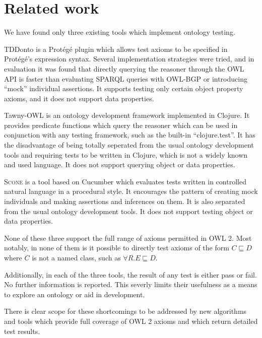 \documentclass[paper.tex]{subfiles}
\begin{document}
\section{Related work}
\label{sec:related}

We have found only three existing tools which implement ontology testing.

TDDonto \cite{Lawrynowicz:TDDontoTool} is a Prot\'eg\'e plugin which allows test axioms to be specified in Prot\'eg\'e's expression syntax.
Several implementation strategies were tried, and in evaluation it was found that directly querying the reasoner through the OWL API \cite{OWLAPI} is faster than evaluating SPARQL queries with OWL-BGP \cite{OWLBGP} or introducing ``mock'' individual assertions.
It supports testing only certain object property axioms, and it does not support data properties.

Tawny-OWL \cite{Warrender:HowWhatWhyTest} is an ontology development framework implemented in Clojure.
It provides predicate functions which query the reasoner which can be used in conjunction with any testing framework, such as the built-in ``clojure.test''.
It has the disadvantage of being totally seperated from the usual ontology development tools and requiring tests to be written in Clojure, which is not a widely known and used language.
It does not support querying object or data properties.

\textsc{Scone} \cite{Scone:Bitbucket} is a tool based on Cucumber \cite{Cucumber} which evaluates tests written in controlled natural language in a procedural style.
It encourages the pattern of creating mock individuals and making assertions and inferences on them.
It is also separated from the usual ontology development tools.  It does not support testing object or data properties.

None of these three support the full range of axioms permitted in OWL 2.
Most notably, in none of them is it possible to directly test axioms of the form $C \sqsubseteq D$ where $C$ is not a named class, such as $\forall R.E \sqsubseteq D$.

Additionally, in each of the three tools, the result of any test is either pass or fail.
No further information is reported.
This severly limits their usefulness as a means to explore an ontology or aid in development.

\todo[no proofs]

There is clear scope for these shortcomings to be addressed by new algorithms and tools which provide full coverage of OWL 2 axioms and which return detailed test results.
\end{document}
